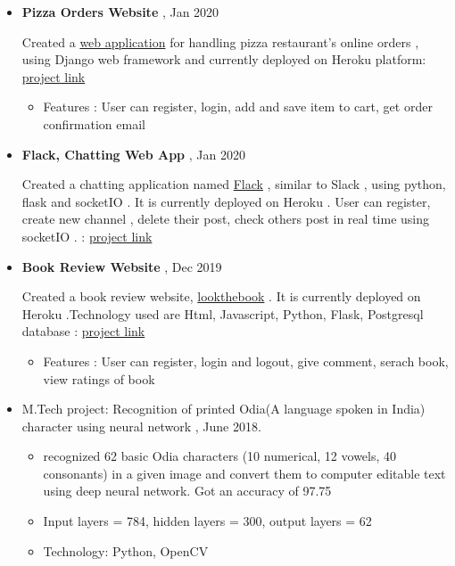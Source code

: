 \documentclass[a4paper,10pt]{article}
\begin{document}
	\begin{itemize}
	\item \textbf{Pizza Orders Website} , Jan 2020
	
	 Created a \href{https://pizzacs50w.herokuapp.com/}{web application} for handling pizza restaurant's online orders , using Django web framework and currently deployed on Heroku platform: \href{https://github.com/eelectron/pizza}{project link}
				
				
					\begin{itemize}
						\item Features : User can register, login, add and save item to cart, get order confirmation email
					\end{itemize}
						
				\item \textbf{Flack, Chatting Web App} , Jan 2020 
				
				Created a chatting application named \href{https://flackthechat.herokuapp.com}{Flack} , similar to Slack , using python, flask and socketIO . It is currently deployed on Heroku . User can register, create new channel , delete their post, check others post in real time using socketIO . : \href{https://github.com/eelectron/flack}{project link} 
				
				\item \textbf{Book Review Website} , Dec 2019
				
				Created a book review website, \href{http://lookthebook.herokuapp.com}{lookthebook} . It is currently deployed on Heroku .Technology used are Html, Javascript, Python, Flask, Postgresql database : \href{https://github.com/eelectron/BookReview}{project link} 
				\begin{itemize}
					\item Features : User can register, login and logout, give comment, serach book, view ratings of book 
				\end{itemize}
				
				\item M.Tech project: Recognition of printed Odia(A language spoken in India) character using neural network , June 2018.
				\begin{itemize}
				    \item recognized 62 basic Odia characters (10 numerical, 12 vowels, 40 consonants) in a given image and convert them to computer editable text using deep neural network. Got an accuracy of 97.75
				    \item Input layers = 784, hidden layers = 300, output layers = 62
				    \item Technology: Python, OpenCV
				\end{itemize}
					

\end{itemize}
\end{document}
